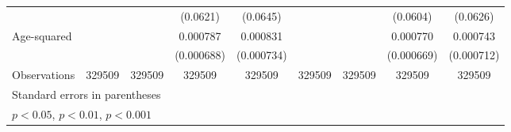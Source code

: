 \begin{table}[htbp]
\begin{tabular}{l*{8}{c}}
                         &                     &                     &    (0.0621)         &    (0.0645)         &                     &                     &    (0.0604)         &    (0.0626)         \\
[1em]
Age-squared              &                     &                     &    0.000787         &    0.000831         &                     &                     &    0.000770         &    0.000743         \\
                         &                     &                     &  (0.000688)         &  (0.000734)         &                     &                     &  (0.000669)         &  (0.000712)         \\
\hline
Observations             &      329509         &      329509         &      329509         &      329509         &      329509         &      329509         &      329509         &      329509         \\
\hline\hline
\multicolumn{9}{l}{\footnotesize Standard errors in parentheses}\\
\multicolumn{9}{l}{\footnotesize \sym{*} \(p<0.05\), \sym{**} \(p<0.01\), \sym{***} \(p<0.001\)}\\
\end{tabular}
\end{table}

